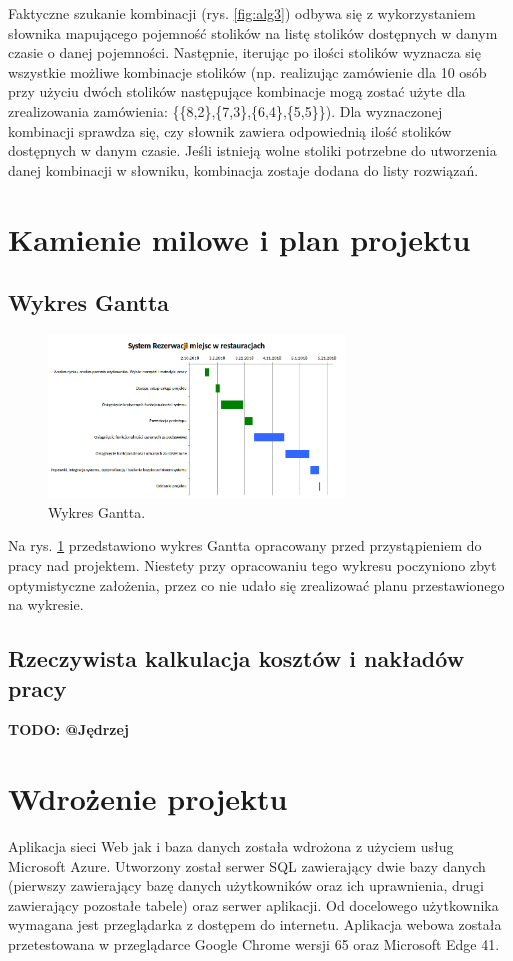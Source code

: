 \documentclass{article}
\begin{document}
Faktyczne szukanie kombinacji (rys. \ref{fig:alg3}) odbywa się z wykorzystaniem słownika mapującego pojemność stolików na listę stolików dostępnych w danym czasie o danej pojemności. Następnie, iterując po ilości stolików wyznacza się wszystkie możliwe kombinacje stolików (np. realizując zamówienie dla 10 osób przy użyciu dwóch stolików następujące kombinacje mogą zostać użyte dla zrealizowania zamówienia: \{\{8,2\},\{7,3\},\{6,4\},\{5,5\}\}). Dla wyznaczonej kombinacji sprawdza się, czy słownik zawiera odpowiednią ilość stolików dostępnych w danym czasie. Jeśli istnieją wolne stoliki potrzebne do utworzenia danej kombinacji w słowniku, kombinacja zostaje dodana do listy rozwiązań.

\section{Kamienie milowe i plan projektu}
\subsection{Wykres Gantta}

\begin{figure}[h]
\centering
	\includegraphics[width=0.70\textwidth]{gantt.png}
	\caption[caption]{Wykres Gantta.}
	\label{fig:gantt}
\end{figure}

Na rys. \ref{fig:gantt} przedstawiono wykres Gantta opracowany przed przystąpieniem do pracy nad projektem. Niestety przy opracowaniu tego wykresu poczyniono zbyt optymistyczne założenia, przez co nie udało się zrealizować planu przestawionego na wykresie.


\subsection{Rzeczywista kalkulacja kosztów i nakładów pracy}
{\color{red}\textbf{TODO: @Jędrzej}}


\section{Wdrożenie projektu}
Aplikacja sieci Web jak i baza danych została wdrożona z użyciem usług Microsoft Azure. Utworzony został serwer SQL zawierający dwie bazy danych (pierwszy zawierający bazę danych użytkowników oraz ich uprawnienia, drugi zawierający pozostałe tabele) oraz serwer aplikacji. Od docelowego użytkownika wymagana jest przeglądarka z dostępem do internetu. Aplikacja webowa została przetestowana w przeglądarce Google Chrome wersji 65 oraz Microsoft Edge 41.
\end{document}
